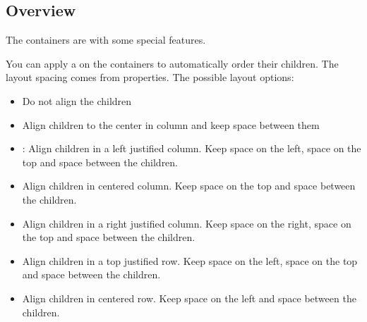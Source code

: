 \documentclass[letterpaper,10pt,english]{sphinxmanual}
\begin{document}
\subsection{Overview}
\label{\detokenize{object-types/cont:overview}}
The containers are  with some special features.

You can apply a  on the containers to automatically order their children. The layout spacing comes from  properties. The possible layout options:
\begin{itemize}
\item {} 
 Do not align the children

\item {} 
 Align children to the center in column and keep  space between them

\item {} 
: Align children in a left justified column. Keep  space on the left,  space on the top and  space between the children.

\item {} 
 Align children in centered column. Keep  space on the top and  space between the children.

\item {} 
 Align children in a right justified column. Keep  space on the right,  space on the top and  space between the children.

\item {} 
 Align children in a top justified row. Keep  space on the left,  space on the top and  space between the children.

\item {} 
 Align children in centered row. Keep  space on the left and  space between the children.


\end{itemize}
\end{document}
